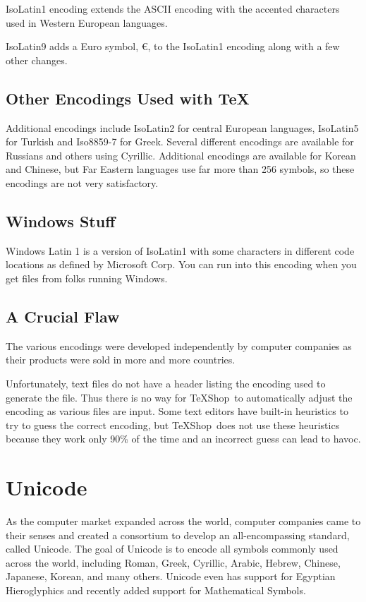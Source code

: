 \documentclass[letterpaper,11pt]{article}
\newcommand{\TS}{\textsf{\TeX Shop}}
\newcommand{\acr}[1]{\textsf{#1}}
\begin{document}
\acr{IsoLatin1} encoding extends the \acr{ASCII} encoding with the accented characters used in Western European languages.

\acr{IsoLatin9} adds a Euro symbol, €, to the \acr{IsoLatin1} encoding along with a few other changes.

\subsection{Other Encodings Used with \TeX}

Additional encodings include \acr{IsoLatin2} for central European languages, \acr{IsoLatin5} for 
\acr{Turkish} and \acr{Iso8859-7} for Greek. Several different encodings are available for Russians and others using Cyrillic. Additional encodings are available for Korean and Chinese, but Far Eastern languages use far more than 256 symbols, so these encodings are not very satisfactory.

\subsection{Windows Stuff}

\acr{Windows Latin 1} is a version of \acr{IsoLatin1} with some characters in different code locations as defined by Microsoft Corp. You can run into this encoding when you get files from folks running Windows.

\subsection{A Crucial Flaw}
The various encodings were developed independently by  computer companies as
their products were sold in more and more countries. 

Unfortunately, text files do not have a header listing the encoding used to generate the
file. Thus there is no way for \TS\ to automatically adjust the encoding as various files are input. 
Some text editors have built-in heuristics to try to guess the correct encoding, but \TS\ does not use these heuristics because they work only 90\% of the time and an incorrect guess can lead to havoc.

\section{\acr{Unicode}}

As the computer market expanded across the world, computer companies came to their senses and created a consortium to develop an all-encompassing standard, called \acr{Unicode}. The goal of \acr{Unicode} is to encode all symbols commonly used across the world, including Roman, Greek, Cyrillic, Arabic, Hebrew, Chinese, Japanese, Korean, and many others. Unicode even has support for Egyptian Hieroglyphics and recently added support for Mathematical Symbols.
\end{document}

